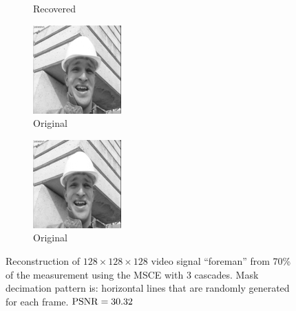 \begin{figure}
\begin{subfigure}{0.4\textwidth}
    \caption{Recovered}
  \end{subfigure}
  \begin{subfigure}{0.4\textwidth}
    \centering
    \includegraphics[width=.9\textwidth]{Chapter7/Images/foreman70_orig_18.png}
    \caption{Original}
  \end{subfigure}
  \begin{subfigure}{0.4\textwidth}
    \centering
    \includegraphics[width=.9\textwidth]{Chapter7/Images/foreman70_orig_22.png}
    \caption{Original}
  \end{subfigure}
  \caption{Reconstruction of $128\times 128\times 128$ video signal ``foreman'' from 70\% of the measurement using the MSCE with 3 cascades. Mask decimation pattern is: horizontal lines that are randomly generated for each frame. $\operatorname*{PSNR} = 30.32$}
\end{figure}

